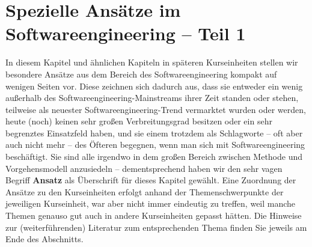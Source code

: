 \chapter{Spezielle Ansätze im Softwareengineering – Teil 1}

In diesem Kapitel und ähnlichen Kapiteln in späteren Kurseinheiten stellen wir besondere Ansätze aus dem Bereich des Softwareengineering kompakt auf wenigen Seiten vor. Diese zeichnen sich dadurch aus, dass sie entweder ein wenig außerhalb des Softwareengineering-Mainstreams ihrer Zeit standen oder stehen, teilweise als neuester Softwareengineering-Trend vermarktet wurden oder werden, heute (noch) keinen sehr großen Verbreitungsgrad besitzen oder ein sehr begrenztes Einsatzfeld haben, und sie einem trotzdem als Schlagworte – oft aber auch nicht mehr – des Öfteren begegnen, wenn man sich mit Softwareengineering beschäftigt. Sie sind alle irgendwo in dem großen Bereich zwischen Methode und Vorgehensmodell anzusiedeln – dementsprechend haben wir den sehr vagen Begriff \textbf{Ansatz} als Überschrift für dieses Kapitel gewählt. Eine Zuordnung der Ansätze zu den Kurseinheiten erfolgt anhand der Themenschwerpunkte der jeweiligen Kurseinheit, war aber nicht immer eindeutig zu treffen, weil manche Themen genauso gut auch in andere Kurseinheiten gepasst hätten. Die Hinweise zur (weiterführenden) Literatur zum entsprechenden Thema finden Sie jeweils am Ende des Abschnitts.




